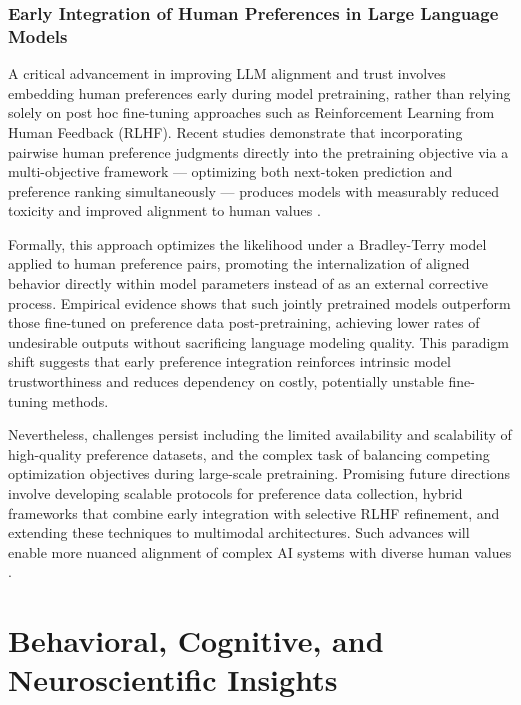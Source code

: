 \documentclass[sigconf]{acmart}
\begin{document}
\subsubsection{Early Integration of Human Preferences in Large Language Models}

A critical advancement in improving LLM alignment and trust involves embedding human preferences early during model pretraining, rather than relying solely on post hoc fine-tuning approaches such as Reinforcement Learning from Human Feedback (RLHF). Recent studies demonstrate that incorporating pairwise human preference judgments directly into the pretraining objective via a multi-objective framework — optimizing both next-token prediction and preference ranking simultaneously — produces models with measurably reduced toxicity and improved alignment to human values \cite{ref41}.

Formally, this approach optimizes the likelihood under a Bradley-Terry model applied to human preference pairs, promoting the internalization of aligned behavior directly within model parameters instead of as an external corrective process. Empirical evidence shows that such jointly pretrained models outperform those fine-tuned on preference data post-pretraining, achieving lower rates of undesirable outputs without sacrificing language modeling quality. This paradigm shift suggests that early preference integration reinforces intrinsic model trustworthiness and reduces dependency on costly, potentially unstable fine-tuning methods.

Nevertheless, challenges persist including the limited availability and scalability of high-quality preference datasets, and the complex task of balancing competing optimization objectives during large-scale pretraining. Promising future directions involve developing scalable protocols for preference data collection, hybrid frameworks that combine early integration with selective RLHF refinement, and extending these techniques to multimodal architectures. Such advances will enable more nuanced alignment of complex AI systems with diverse human values \cite{ref41}.

\section{Behavioral, Cognitive, and Neuroscientific Insights}
\end{document}
